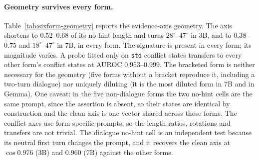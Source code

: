 \documentclass[10pt]{article}
\begin{document}
\paragraph{Geometry survives every form.}
Table~\ref{tab:sixform-geometry} reports the evidence-axis geometry. The axis
shortens to $0.52$--$0.68$ of its no-hint length and turns
$28^\circ$--$47^\circ$ in 3B, and to $0.38$--$0.75$ and $18^\circ$--$47^\circ$
in 7B, in every form. The signature is present in every form; its magnitude
varies. A probe fitted only on \texttt{std} conflict states
transfers to every other form's conflict states at AUROC $0.953$--$0.999$. The
bracketed form is neither necessary for the geometry (five forms without a
bracket reproduce it, including a two-turn dialogue) nor uniquely diluting
(it is the most diluted form in 7B and in Gemma). One caveat: in the five non-dialogue forms the two
no-hint cells are the same prompt, since the assertion is absent, so their
states are identical by construction and the clean axis is one vector shared
across those forms. The conflict axes use form-specific prompts, so the length
ratios, rotations and transfers are not trivial. The dialogue no-hint cell is
an independent test because its neutral first turn changes the prompt, and it
recovers the clean axis at $\cos 0.976$ (3B) and $0.960$ (7B) against the
other forms.
\end{document}
